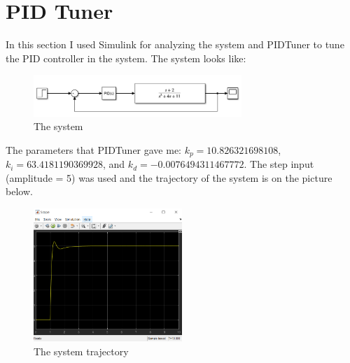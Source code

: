 \documentclass{article}
\begin{document}
\section{PID Tuner}
In this section I used Simulink for analyzing the system and PIDTuner to tune the PID controller in the system. The system looks like:
\begin{figure}[H]
        \centering
        \includegraphics[width=0.7\textwidth]{images/7}
        \caption{The system}
        \label{fig:plot3_1}
\end{figure}
The parameters that PIDTuner gave me: $k_p = 10.826321698108$, $k_i = 63.4181190369928$, and $k_d = -0.0076494311467772$. The step input (amplitude = 5) was used and the trajectory of the system is on the picture below.
\begin{figure}[H]
        \centering
        \includegraphics[width=0.5\textwidth]{images/6}
        \caption{The system trajectory}
        \label{fig:plot3_2}
\end{figure}
\end{document}
